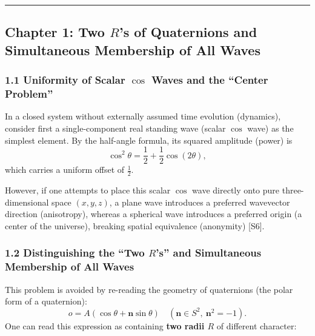 \documentclass[
  a4paper,
]{article}
\begin{document}
\begin{center}\rule{0.5\linewidth}{0.5pt}\end{center}

\subsection{\texorpdfstring{Chapter 1: Two \(R\)'s of Quaternions and
Simultaneous Membership of All
Waves}{Chapter 1: Two R's of Quaternions and Simultaneous Membership of All Waves}}\label{chapter-1-two-rs-of-quaternions-and-simultaneous-membership-of-all-waves}

\subsubsection{\texorpdfstring{1.1 Uniformity of Scalar \(\cos\) Waves
and the ``Center
Problem''}{1.1 Uniformity of Scalar \textbackslash cos Waves and the ``Center Problem''}}\label{uniformity-of-scalar-cos-waves-and-the-center-problem}

In a closed system without externally assumed time evolution (dynamics),
consider first a single-component real standing wave (scalar \(\cos\)
wave) as the simplest element. By the half-angle formula, its squared
amplitude (power) is
\[\cos^2\theta = \frac{1}{2} + \frac{1}{2}\cos(2\theta),\] which carries
a uniform offset of \(\frac{1}{2}\).

However, if one attempts to place this scalar \(\cos\) wave directly
onto pure three-dimensional space \((x, y, z)\), a plane wave introduces
a preferred wavevector direction (anisotropy), whereas a spherical wave
introduces a preferred origin (a center of the universe), breaking
spatial equivalence (anonymity) {[}S6{]}.

\subsubsection{\texorpdfstring{1.2 Distinguishing the ``Two \(R\)'s''
and Simultaneous Membership of All
Waves}{1.2 Distinguishing the ``Two R's'' and Simultaneous Membership of All Waves}}\label{distinguishing-the-two-rs-and-simultaneous-membership-of-all-waves}

This problem is avoided by re-reading the geometry of quaternions (the
polar form of a quaternion):
\[o = A(\cos\theta + \mathbf{n}\sin\theta) \quad (\mathbf{n} \in S^2,\ \mathbf{n}^2 = -1).\]
One can read this expression as containing \textbf{two radii \(R\)} of
different character:
\end{document}
